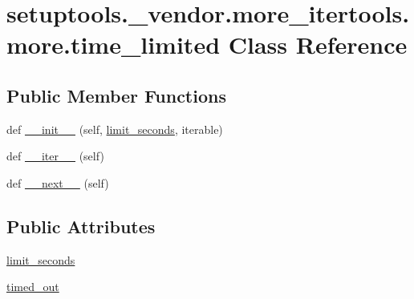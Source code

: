 \hypertarget{classsetuptools_1_1__vendor_1_1more__itertools_1_1more_1_1time__limited}{}\section{setuptools.\+\_\+vendor.\+more\+\_\+itertools.\+more.\+time\+\_\+limited Class Reference}
\label{classsetuptools_1_1__vendor_1_1more__itertools_1_1more_1_1time__limited}
\subsection*{Public Member Functions}
\begin{DoxyCompactItemize}
\item 
def \hyperlink{classsetuptools_1_1__vendor_1_1more__itertools_1_1more_1_1time__limited_a5216044d2d66082b691e81ff550f5852}{\+\_\+\+\_\+init\+\_\+\+\_\+} (self, \hyperlink{classsetuptools_1_1__vendor_1_1more__itertools_1_1more_1_1time__limited_afd9a751859ddb2a44350cc60410ee67c}{limit\+\_\+seconds}, iterable)
\item 
def \hyperlink{classsetuptools_1_1__vendor_1_1more__itertools_1_1more_1_1time__limited_ad067f53e0b929535792e20c4d1d9e354}{\+\_\+\+\_\+iter\+\_\+\+\_\+} (self)
\item 
def \hyperlink{classsetuptools_1_1__vendor_1_1more__itertools_1_1more_1_1time__limited_a1100c3ff67bbeb84a1468548a144b1e7}{\+\_\+\+\_\+next\+\_\+\+\_\+} (self)
\end{DoxyCompactItemize}
\subsection*{Public Attributes}
\begin{DoxyCompactItemize}
\item 
\hyperlink{classsetuptools_1_1__vendor_1_1more__itertools_1_1more_1_1time__limited_afd9a751859ddb2a44350cc60410ee67c}{limit\+\_\+seconds}
\item 
\hyperlink{classsetuptools_1_1__vendor_1_1more__itertools_1_1more_1_1time__limited_a2ba9fc293c2fd559a84c1ad9a1f653d1}{timed\+\_\+out}
\end{DoxyCompactItemize}


